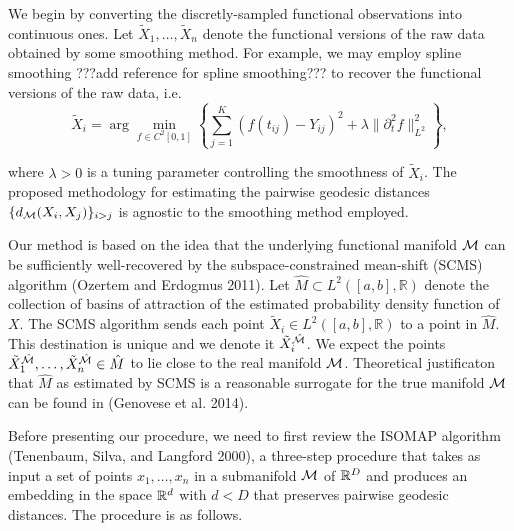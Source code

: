 We begin by converting the discretly-sampled functional observations
into continuous ones. Let \(\tilde X_1,\ldots,\tilde X_n\) denote the
functional versions of the raw data obtained by some smoothing method.
For example, we may employ spline smoothing ???add reference for spline
smoothing??? to recover the functional versions of the raw data, i.e.\\

\begin{equation}\label{eq_spline_smoothing} 
\tilde X_i = \arg \min_{f\in C^2[0,1]}\left\{\sum_{j=1}^{K}\left(f(t_{ij})-Y_{ij}\right)^2+\lambda \|\partial^2_tf\|^2_{L^2}\right\},
\end{equation}

where \(\lambda>0\) is a tuning parameter controlling the smoothness of
\(\tilde X_i\). The proposed methodology for estimating the pairwise
geodesic distances \(\{ d_{\mathcal{M}} (X_i,X_j)\}_{i>j}\) is agnostic to the
smoothing method employed.

Our method is based on the idea that the underlying functional manifold
\(\mathcal{M}\) can be sufficiently well-recovered by the subspace-constrained
mean-shift (SCMS) algorithm (Ozertem and Erdogmus 2011). Let
\(\hat M \subset L^2([a,b],\mathbb R)\) denote the collection of basins
of attraction of the estimated probability density function of \(X\).
The SCMS algorithm sends each point
\(\tilde X_i \in L^2([a,b],\mathbb R)\) to a point in \(\hat M\). This
destination is unique and we denote it \(\tilde X_i^{\hat {\mathcal{M}}}\). We
expect the points
\(\tilde X^{\hat {\mathcal{M}}}_1,\ldots,\tilde X^{\hat {\mathcal{M}}}_n \in \hat M\) to lie
close to the real manifold \(\mathcal{M}\). Theoretical justificaton that
\(\hat M\) as estimated by SCMS is a reasonable surrogate for the true
manifold \(\mathcal{M}\) can be found in (Genovese et al. 2014).

Before presenting our procedure, we need to first review the ISOMAP
algorithm (Tenenbaum, Silva, and Langford 2000), a three-step procedure
that takes as input a set of points \(x_1,\ldots,x_n\) in a submanifold
\(\mathcal{M}\) of \(\mathbb{R}^D\) and produces an embedding in the space \(\mathbb{R}^d\) with
\(d<D\) that preserves pairwise geodesic distances. The procedure is as
follows.

